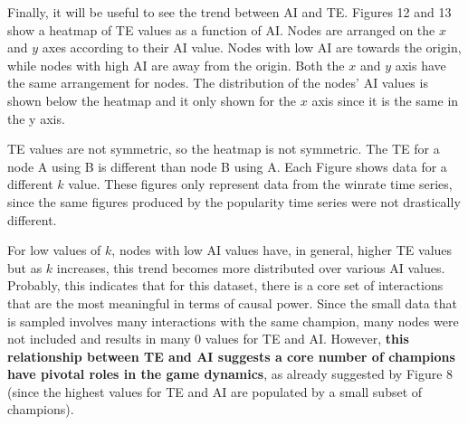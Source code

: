 \documentclass[twoside]{article}
\begin{document}
\begin{multicols}{2}
Finally, it will be useful to see the trend between AI and TE. Figures 12 and 13 show a heatmap of TE values as a function of AI. Nodes are arranged on the $x$ and $y$ axes according to their AI value. Nodes with low AI are towards the origin, while nodes with high AI are away from the origin. Both the $x$ and $y$ axis have the same arrangement for nodes. The distribution of the nodes' AI values is shown below the heatmap and it only shown for the $x$ axis since it is the same in the y axis. 

TE values are not symmetric, so the heatmap is not symmetric. The TE for a node A using B is different than node B using A. Each Figure shows data for a different $k$ value. These figures only represent data from the winrate time series, since the same figures produced by the popularity time series were not drastically different.

For low values of $k$, nodes with low AI values have, in general, higher TE values but as $k$ increases, this trend becomes more distributed over various AI values. Probably, this indicates that for this dataset, there is a core set of interactions that are the most meaningful in terms of causal power. Since the small data that is sampled involves many interactions with the same champion, many nodes were not included and results in many 0 values for TE and AI. However, \textbf{this relationship between TE and AI suggests a core number of champions have pivotal roles in the game dynamics}, as already suggested by Figure 8 (since the highest values for TE and AI are populated by a small subset of champions).


\end{multicols}
\end{document}
